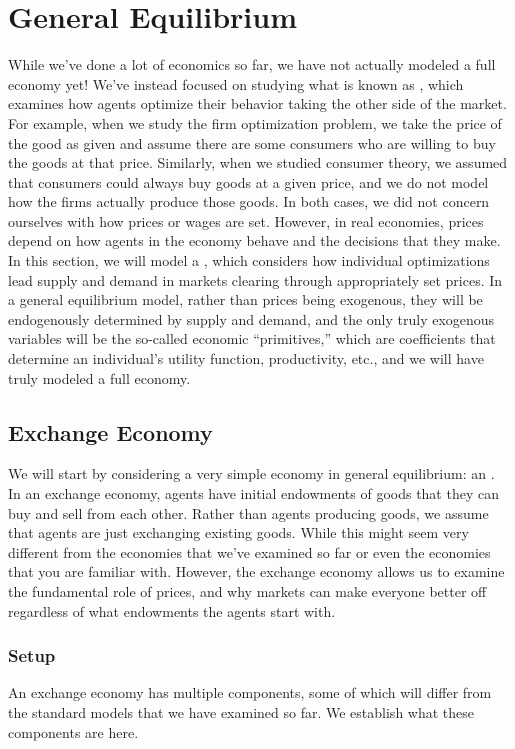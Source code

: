 \chapter{General Equilibrium}
While we've done a lot of economics so far, we have not actually modeled a full economy yet! We've instead focused on studying what is known as , which examines how agents optimize their behavior taking the other side of the market. For example, when we study the firm optimization problem, we take the price of the good as given and assume there are some consumers who are willing to buy the goods at that price. Similarly, when we studied consumer theory, we assumed that consumers could always buy goods at a given price, and we do not model how the firms actually produce those goods. In both cases, we did not concern ourselves with how prices or wages are set. However, in real economies, prices depend on how agents in the economy behave and the decisions that they make. In this section, we will model a , which considers how individual optimizations lead supply and demand in markets clearing through appropriately set prices. In a general equilibrium model, rather than prices being exogenous, they will be endogenously determined by supply and demand, and the only truly exogenous variables will be the so-called economic ``primitives,'' which are coefficients that determine an individual's utility function, productivity, etc., and we will have truly modeled a full economy. 

\section{Exchange Economy}
We will start by considering a very simple economy in general equilibrium: an . In an exchange economy, agents have initial endowments of goods that they can buy and sell from each other. Rather than agents producing goods, we assume that agents are just exchanging existing goods. While this might seem very different from the economies that we've examined so far or even the economies that you are familiar with. However, the exchange economy allows us to examine the fundamental role of prices, and why markets can make everyone better off regardless of what endowments the agents start with.

\subsection*{Setup}
An exchange economy has multiple components, some of which will differ from the standard models that we have examined so far. We establish what these components are here.

